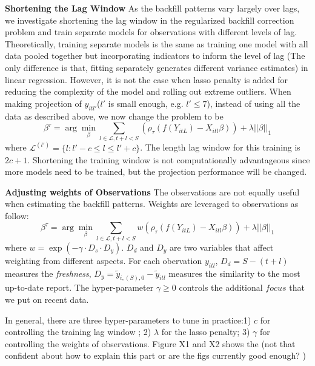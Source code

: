 \textbf{Shortening the Lag Window}
As the backfill patterns vary largely over lags, we investigate shortening the lag window in the regularized backfill correction problem and train separate models for observations with different levels of lag. Theoretically, training separate models is the same as training one model with all data pooled together but incorporating indicators to inform the level of lag (The only difference is that, fitting separately generates different variance estimates) in linear regression. However, it is not the case when lasso penalty is added for reducing the complexity of the model and rolling out extreme outliers. When making projection of $y_{itl'}$($l'$ is small enough, e.g. $l' \leq 7$), instead of using all the data as described above, we now change the problem to be
$$ \beta^{\tau} = \arg\min_{\beta} \sum_{l\in \mathcal{L}, t+l < S}(\rho_\tau (f(Y_{itL}) - X_{itl}\beta)) + \lambda ||\beta||_1$$
where $\mathcal{L}^(l') = \{l: l'-c \leq l \leq l'+ c\}$. The length lag window for this training is $2c +1$. Shortening the training window is not computationally advantageous since more models need to be trained, but the projection performance will be changed.

\textbf{Adjusting weights of Observations} The observations are not equally useful when estimating the backfill patterns. Weights are leveraged to observations as follow:
$$ \beta^{\tau} = \arg\min_{\beta} \sum_{l\in \mathcal{L}, t+l < S}w(\rho_\tau (f(Y_{itL}) - X_{itl}\beta)) + \lambda ||\beta||_1$$
where $w = \exp(-\gamma \cdot D_s \cdot D_y)$. $D_d$ and $D_y$ are two variables that affect weighting from different aspects. For each obervation $y_{itl}$, $D_d = S - (t+l)$ measures the \textit{freshness}, $D_y = \widetilde{y}_{i,(S),0} - \widetilde{y}_{itl}$ measures the similarity to the most up-to-date report. The hyper-parameter $\gamma \geq 0$ controls the additional $focus$ that we put on recent data. 

In general, there are three hyper-parameters to tune in practice:1) $c$ for controlling the training lag window ; 2) $\lambda$ for the lasso penalty; 3) $\gamma$ for controlling the weights of observations. Figure X1 and X2 shows the (not that confident about how to explain this part or are the figs currently good enough? )

